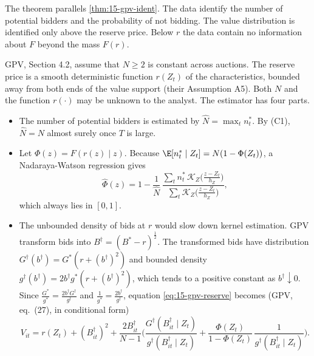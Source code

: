 The theorem parallels \cref{thm:15-gpv-ident}. The data identify the number of potential bidders and the probability of not bidding. The value distribution is identified only above the reserve price. Below $r$ the data contain no information about $F$ beyond the mass $F(r)$.

 GPV, Section 4.2, assume that $N\ge2$ is constant across auctions. The reserve price is a smooth deterministic function $r(Z_t)$ of the characteristics, bounded away from both ends of the value support (their Assumption A5). Both $N$ and the function $r(\cdot)$ may be unknown to the analyst. The estimator has four parts.
\begin{itemize}
\item The number of potential bidders is estimated by $\hat N=\max_tn^*_t$. By (C1), $\hat N=N$ almost surely once $T$ is large.
\item Let $\Phi(z)=F(r(z)\mid z)$. Because $\E[n^*_t\mid Z_t]=N(1-\Phi(Z_t))$, a Nadaraya-Watson regression \citep{Nadaraya1964,Watson1964} gives
\[
\hat\Phi(z)=1-\frac{1}{\hat N}\,\frac{\sum_tn^*_t\,\mathcal K_Z\big(\frac{z-Z_t}{h_Z}\big)}{\sum_t\mathcal K_Z\big(\frac{z-Z_t}{h_Z}\big)},
\]
which always lies in $[0,1]$.
\item The unbounded density of bids at $r$ would slow down kernel estimation. GPV transform bids into $B^\dagger=(B^*-r)^{\frac12}$. The transformed bids have distribution $G^\dagger(b^\dagger)=G^*(r+(b^\dagger)^2)$ and bounded density $g^\dagger(b^\dagger)=2b^\dagger g^*(r+(b^\dagger)^2)$, which tends to a positive constant as $b^\dagger\downarrow0$. Since $\frac{G^*}{g^*}=\frac{2b^\dagger G^\dagger}{g^\dagger}$ and $\frac{1}{g^*}=\frac{2b^\dagger}{g^\dagger}$, equation \eqref{eq:15-gpv-reserve} becomes (GPV, eq.~(27), in conditional form)
\begin{equation}\label{eq:15-gpv-reserve-dagger}
V_{it}=r(Z_t)+(B^\dagger_{it})^2+\frac{2B^\dagger_{it}}{N-1}\Big(\frac{G^\dagger(B^\dagger_{it}\mid Z_t)}{g^\dagger(B^\dagger_{it}\mid Z_t)}+\frac{\Phi(Z_t)}{1-\Phi(Z_t)}\,\frac{1}{g^\dagger(B^\dagger_{it}\mid Z_t)}\Big).
\end{equation}

\end{itemize}
